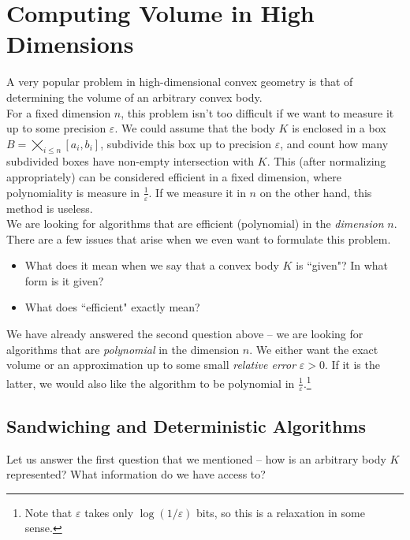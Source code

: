 \section{Computing Volume in High Dimensions}

A very popular problem in high-dimensional convex geometry is that of determining the volume of an arbitrary convex body.\\

For a fixed dimension $n$, this problem isn't too difficult if we want to measure it up to some precision $\varepsilon$. We could assume that the body $K$ is enclosed in a box $B=\bigtimes_{i\leq n}[a_i,b_i]$, subdivide this box up to precision $\varepsilon$, and count how many subdivided boxes have non-empty intersection with $K$. This (after normalizing appropriately) can be considered efficient in a fixed dimension, where polynomiality is measure in $\frac{1}{\varepsilon}$. If we measure it in $n$ on the other hand, this method is useless.\\
We are looking for algorithms that are efficient (polynomial) in the \textit{dimension} $n$.\\

There are a few issues that arise when we even want to formulate this problem.
\begin{itemize}
	\item What does it mean when we say that a convex body $K$ is ``given"? In what form is it given?
	\item What does ``efficient" exactly mean?
\end{itemize}

We have already answered the second question above -- we are looking for algorithms that are \textit{polynomial} in the dimension $n$. We either want the exact volume or an approximation up to some small \textit{relative error} $\varepsilon>0$. If it is the latter, we would also like the algorithm to be polynomial in $\frac{1}{\varepsilon}$.\footnote{Note that $\varepsilon$ takes only $\log(1/\varepsilon)$ bits, so this is a relaxation in some sense.}

\subsection{Sandwiching and Deterministic Algorithms}
\label{subsec: sandwiching and deterministic algorithms}

Let us answer the first question that we mentioned -- how is an arbitrary body $K$ represented? What information do we have access to?

